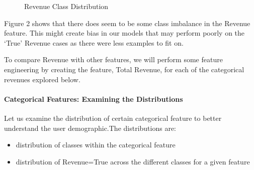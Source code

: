 \documentclass[
  letterpaper,
  DIV=11,
  numbers=noendperiod]{scrartcl}
\let\oldparagraph\paragraph
\renewcommand{\paragraph}[1]{\oldparagraph{#1}\mbox{}}
\begin{document}
\begin{figure}[H]


\caption{\label{fig-revenue-distribution}Revenue Class Distribution}

\end{figure}%

Figure 2 shows that there does seem to be some class imbalance in the
Revenue feature. This might create bias in our models that may perform
poorly on the `True' Revenue cases as there were less examples to fit
on.

To compare Revenue with other features, we will perform some feature
engineering by creating the feature, Total Revenue, for each of the
categorical revenues explored below.

\paragraph{Categorical Features: Examining the
Distributions}\label{categorical-features-examining-the-distributions}

Let us examine the distribution of certain categorical feature to better
understand the user demographic.The distributions are:

\begin{itemize}
\item
  distribution of classes within the categorical feature
\item
  distribution of Revenue=True across the different classes for a given
  feature
\end{itemize}
\end{document}
